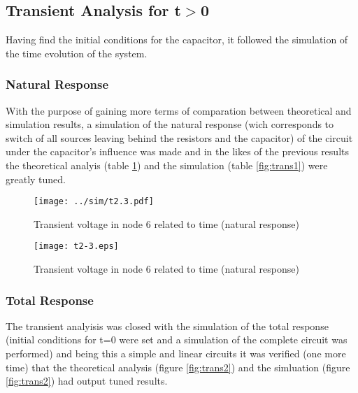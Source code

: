 

\subsection{Transient Analysis for t$>$0}

Having find the initial conditions for the capacitor, it followed the simulation of the time evolution of the system.

\subsubsection{Natural Response}

With the purpose of gaining more terms of comparation between theoretical and simulation results, a simulation of the natural response (wich corresponds to switch of all sources leaving behind the resistors and the capacitor) of the circuit under the capacitor's influence was made and in the likes of the previous results the theoretical analyis (table \ref{compnat}) and the simulation (table \ref{fig:trans1}) were greatly tuned.

\begin{figure}[h] \centering
  \begin{minipage}{.5\linewidth}
    \vspace{-3mm}
    \texttt{[image: ../sim/t2.3.pdf]}
    \caption{Transient voltage in node 6 related to time (natural response)}
    \label{fig:trans1}
    \end{minipage}%
    \begin{minipage}{.5\textwidth}
  \centering
    \texttt{[image: t2-3.eps]}
    \caption{Transient voltage in node 6 related to time (natural response)}
    \label{compnat}
      \end{minipage}%
\end{figure}
  
\subsubsection{Total Response}

The transient analyisis was closed with the simulation of the total response (initial conditions for t=0 were set and a simulation of the complete circuit was performed) and being this a simple and linear circuits it was verified (one more time) that the theoretical analysis (figure \ref{fig:trans2}) and the simluation (figure \ref{fig:trans2}) had output tuned results.

